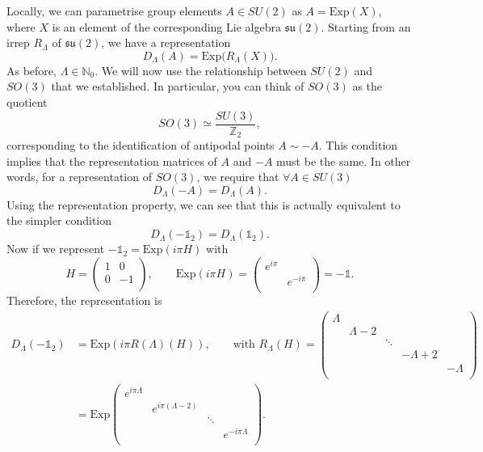 Locally, we can parametrise group elements $A \in SU(2)$ as $A = \text{Exp}(X)$, where $X$ is an element of the corresponding Lie algebra $\mathfrak{su}(2)$.
Starting from an irrep $R_\Lambda$ of $\mathfrak{su}(2)$, we have a representation 
\begin{equation}
  D_\Lambda(A) = \text{Exp} \bigl(R_\Lambda(X)\bigr).
\end{equation}
As before, $\Lambda \in \mathbb{N}_0$.
We will now use the relationship between $SU(2)$ and $SO(3)$ that we established. In particular, you can think of $SO(3)$ as the quotient
\begin{equation}
  SO(3) \simeq \frac{SU(3)}{\mathbb{Z}_2},
\end{equation}
corresponding to the identification of antipodal points $A \sim -A$.
This condition implies that the representation matrices of $A$ and $-A$ must be the same.
In other words, for a representation of $SO(3)$, we require that $\forall A \in SU(3)$
\begin{equation}
  D_\Lambda(-A) = D_\Lambda(A).
\end{equation}
Using the representation property, we can see that this is actually equivalent to the simpler condition
\begin{equation}
  D_\Lambda (-\mathbb{1}_2) = D_{\Lambda}(\mathbb{1}_2).
\end{equation}
Now if we represent $-\mathbb{1}_2 = \text{Exp}(i\pi H)$ with 
\begin{equation}
  H = 
  \begin{pmatrix}
   1 & 0 \\
   0 & -1 \\
  \end{pmatrix}, 
  \qquad \text{Exp}(i \pi H) = 
  \begin{pmatrix}
   e^{i\pi} &  \\
    & e^{-i\pi} \\
  \end{pmatrix} = -\mathbb{1}.
\end{equation}
Therefore, the representation is
\begin{align}
  D_\Lambda(-\mathbb{1}_2) &= \text{Exp}(i\pi R(\Lambda)(H)), \qquad \text{with } R_\Lambda(H) = 
  \begin{pmatrix}
   \Lambda &  &  &  &  \\
    & \Lambda-2 &  &  &  \\
    &  & \ddots &  &  \\
    &  &  & -\Lambda + 2 &  \\
    &  &  &  & -\Lambda \\
  \end{pmatrix} \\
			   &= \text{Exp}
           \begin{pmatrix}
            e^{i\pi \Lambda} &  &  &  \\
			     & e^{i \pi (\Lambda - 2)} &  &  \\
             &  & \ddots &  \\
             &  &  & e^{-i \pi \Lambda} \\
           \end{pmatrix}.
\end{align}
